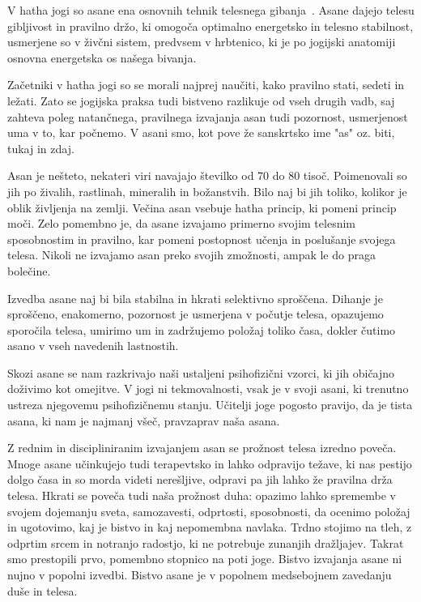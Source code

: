 \documentclass[a4paper, 12pt]{book}
\begin{document}
V hatha jogi so asane ena osnovnih tehnik telesnega gibanja~\cite{Asane}. Asane dajejo telesu gibljivost in pravilno držo, ki omogoča optimalno energetsko in telesno stabilnost, usmerjene so v živčni sistem, predvsem v hrbtenico, ki je po jogijski anatomiji osnovna energetska os našega bivanja.

Začetniki v hatha jogi so se morali najprej naučiti, kako pravilno stati, sedeti in ležati. Zato se jogijska praksa tudi bistveno razlikuje od vseh drugih vadb, saj zahteva poleg natančnega, pravilnega izvajanja asan tudi pozornost, usmerjenost uma v to, kar počnemo. V asani smo, kot pove že sanskrtsko ime "as" oz. biti, tukaj in zdaj.

Asan je nešteto, nekateri viri navajajo številko od 70 do 80 tisoč. Poimenovali so jih po živalih, rastlinah, mineralih in  božanstvih. Bilo naj bi jih toliko, kolikor je oblik življenja na zemlji. Večina asan vsebuje hatha princip, ki pomeni princip moči. Zelo pomembno je, da asane izvajamo primerno svojim telesnim sposobnostim in pravilno, kar pomeni postopnost učenja in poslušanje svojega telesa. Nikoli ne izvajamo asan preko svojih zmožnosti, ampak le do praga bolečine. 

Izvedba asane naj bi bila stabilna in hkrati selektivno sproščena. Dihanje je sproščeno, enakomerno, pozornost je usmerjena v počutje telesa, opazujemo sporočila telesa, umirimo um in zadržujemo položaj toliko časa, dokler čutimo asano v vseh navedenih lastnostih. 

Skozi asane se nam razkrivajo naši ustaljeni psihofizični vzorci, ki jih običajno doživimo kot omejitve. V jogi ni tekmovalnosti, vsak je v svoji asani, ki trenutno ustreza njegovemu psihofizičnemu stanju. Učitelji joge pogosto pravijo, da je tista asana, ki nam je najmanj všeč, pravzaprav naša asana.

Z rednim in discipliniranim izvajanjem asan se prožnost telesa izredno poveča. Mnoge asane učinkujejo tudi terapevtsko in lahko odpravijo težave, ki nas pestijo dolgo časa in so morda videti nerešljive, odpravi pa jih lahko že pravilna drža telesa. Hkrati se poveča tudi naša prožnost duha: opazimo lahko spremembe v svojem dojemanju sveta, samozavesti, odprtosti, sposobnosti, da ocenimo položaj in ugotovimo, kaj je bistvo in kaj nepomembna navlaka. Trdno stojimo na tleh, z odprtim srcem in notranjo radostjo, ki ne potrebuje zunanjih dražljajev. Takrat smo prestopili prvo, pomembno stopnico na poti joge.
Bistvo izvajanja asane ni nujno v popolni izvedbi. Bistvo asane je v popolnem medsebojnem zavedanju duše in telesa.
\end{document}
